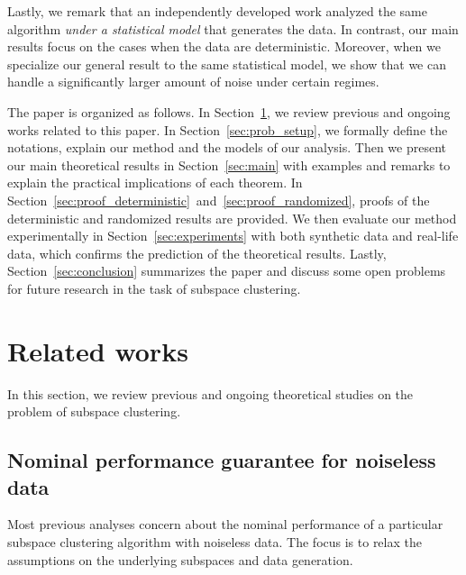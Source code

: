 \documentclass[twoside,11pt]{article}
\numberwithin{equation}{section}
\begin{document}
Lastly, we remark that an independently developed work \citep{soltanolkotabi2013robust} analyzed the same algorithm {\em under a statistical model} that generates the data. In contrast, our main results focus on the cases when the data are deterministic. Moreover, when we specialize our general result to the same statistical model, we show that we can handle a significantly larger amount of noise under certain regimes.


The paper is organized as follows. In Section~\ref{sec:RelatedWorks}, we review previous and ongoing works related to this paper. In Section~\ref{sec:prob_setup}, we formally define the notations, explain our method and the models of our analysis. Then we present our main theoretical results in Section~\ref{sec:main} with examples and remarks to explain the practical implications of each theorem. In Section~\ref{sec:proof_deterministic}~and~\ref{sec:proof_randomized}, proofs of the deterministic and randomized results are provided. We then evaluate our method experimentally in Section~\ref{sec:experiments} with both synthetic data and real-life data, which confirms the prediction of the theoretical results. Lastly, Section~\ref{sec:conclusion} summarizes the paper and discuss some open problems for future research in the task of subspace clustering.


\section{Related works}\label{sec:RelatedWorks}
In this section, we review  previous and ongoing theoretical studies on the problem of subspace clustering.

\subsection{Nominal performance guarantee for noiseless data}
Most previous analyses concern about the nominal performance of a particular subspace clustering algorithm with noiseless data. The focus is to relax the assumptions on the underlying subspaces and data generation.
\end{document}
